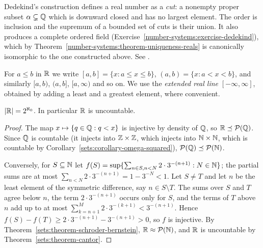 \begin{remark}\label{number-systems:remark-dedekind-cuts}
Dedekind's construction \cite{dedekind-1872} defines a real number as a
\emph{cut}: a nonempty proper subset $\alpha \subsetneq \mathbb{Q}$ which is downward
closed and has no largest element. The order is inclusion and the supremum of
a bounded set of cuts is their union. It also produces a complete ordered
field (Exercise~\ref{number-systems:exercise-dedekind}), which by
Theorem~\ref{number-systems:theorem-uniqueness-reals} is canonically isomorphic
to the one constructed above. See \cite[Appendix to Chapter 1]{rudin-principles}.
\end{remark}

\begin{notation}\label{number-systems:notation-intervals}
For $a \leq b$ in $\mathbb{R}$ we write $[a, b] = \{x : a \leq x \leq b\}$,
$(a, b) = \{x : a < x < b\}$, and similarly $[a, b)$, $(a, b]$, $[a, \infty)$ and so
on. We use the \emph{extended real line} $[-\infty, \infty]$, obtained by adding a
least and a greatest element, where convenient.
\end{notation}

\begin{proposition}\label{number-systems:proposition-reals-cardinality}
$|\mathbb{R}| = 2^{\aleph_0}$. In particular $\mathbb{R}$ is uncountable.
\end{proposition}

\begin{proof}
The map $x \mapsto \{q \in \mathbb{Q} : q < x\}$ is injective by density of $\mathbb{Q}$, so
$\mathbb{R} \preceq \mathcal{P}(\mathbb{Q})$. Since $\mathbb{Q}$ is countable (it injects into
$\mathbb{Z} \times \mathbb{Z}$, which injects into $\mathbb{N} \times \mathbb{N}$, which is countable by
Corollary~\ref{sets:corollary-omega-squared}), $\mathcal{P}(\mathbb{Q}) \preceq \mathcal{P}(\mathbb{N})$.

Conversely, for $S \subseteq \mathbb{N}$ let
$f(S) = \sup\{\sum_{n \in S, n < N} 2 \cdot 3^{-(n+1)} : N \in \mathbb{N}\}$; the partial sums
are at most $\sum_{n < N} 2 \cdot 3^{-(n+1)} = 1 - 3^{-N} < 1$. Let $S \neq T$ and let
$n$ be the least element of the symmetric difference, say $n \in S \setminus T$.
The sums over $S$ and $T$ agree below $n$, the term $2 \cdot 3^{-(n+1)}$ occurs
only for $S$, and the terms of $T$ above $n$ add up to at most
$\sum_{k = n+1}^{M} 2 \cdot 3^{-(k+1)} < 3^{-(n+1)}$. Hence
$f(S) - f(T) \geq 2 \cdot 3^{-(n+1)} - 3^{-(n+1)} > 0$, so $f$ is injective. By
Theorem~\ref{sets:theorem-schroder-bernstein}, $\mathbb{R} \approx \mathcal{P}(\mathbb{N})$, and
$\mathbb{R}$ is uncountable by Theorem~\ref{sets:theorem-cantor}.
\end{proof}

